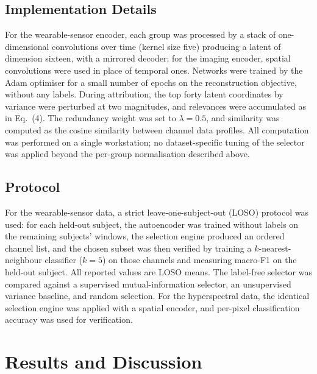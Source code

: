 \documentclass[conference]{IEEEtran}
\begin{document}
\subsection{Implementation Details}
For the wearable-sensor encoder, each group was processed by a stack of
one-dimensional convolutions over time (kernel size five) producing a latent of
dimension sixteen, with a mirrored decoder; for the imaging encoder, spatial
convolutions were used in place of temporal ones. Networks were trained by the
Adam optimiser for a small number of epochs on the reconstruction objective,
without any labels. During attribution, the top forty latent coordinates by
variance were perturbed at two magnitudes, and relevances were accumulated as in
Eq.~(4). The redundancy weight was set to $\lambda = 0.5$, and similarity was
computed as the cosine similarity between channel data profiles. All computation
was performed on a single workstation; no dataset-specific tuning of the selector
was applied beyond the per-group normalisation described above.

\subsection{Protocol}
For the wearable-sensor data, a strict leave-one-subject-out (LOSO) protocol was
used: for each held-out subject, the autoencoder was trained without labels on
the remaining subjects' windows, the selection engine produced an ordered channel
list, and the chosen subset was then verified by training a $k$-nearest-neighbour
classifier ($k{=}5$) on those channels and measuring macro-F1 on the held-out
subject. All reported values are LOSO means. The label-free selector was compared
against a supervised mutual-information selector, an unsupervised variance
baseline, and random selection. For the hyperspectral data, the identical
selection engine was applied with a spatial encoder, and per-pixel
classification accuracy was used for verification.

\section{Results and Discussion}
\end{document}
